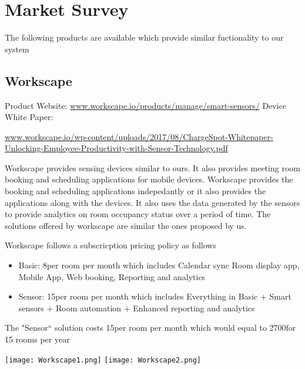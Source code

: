 \chapter{Market Survey}
The following products are available which provide similar fuctionality to our system

\section{Workscape}


Product Website: 
\url{www.workscape.io/products/manage/smart-sensors/}
\newline
Device White Paper: 

\url{www.workscape.io/wp-content/uploads/2017/08/ChargeSpot-Whitepaper-Unlocking-Employee-Productivity-with-Sensor-Technology.pdf}


Workscape provides sensing devices similar to ours. It also provides meeting room booking and scheduling applications for mobile devices.
Workscape provides the booking and scheduling applications indepedantly or it also provides the applications along with the devices.
It also uses the data generated by the sensors to provide analytics on room occupancy status over a period of time.
The solutions offered by workscape are similar the ones proposed by us.

Workscape follows a subscricption pricing policy as follows
\begin{itemize}
\item Basic: 8\textdollar per room per month which includes Calendar sync Room display app, Mobile App, Web booking, Reporting and analytics
\item Sensor: 15\textdollar per room per month which includes Everything in Basic + Smart sensors + Room automation + Enhanced reporting and analytics
\end{itemize}

The "Sensor`` solution costs 15\textdollar per room per month which would equal to 2700\textdollar for 15 rooms per year

\vspace{10pt}

\begin{center}
	\texttt{[image: Workscape1.png]}
	\hspace{40pt}
	\texttt{[image: Workscape2.png]}
\end{center}

